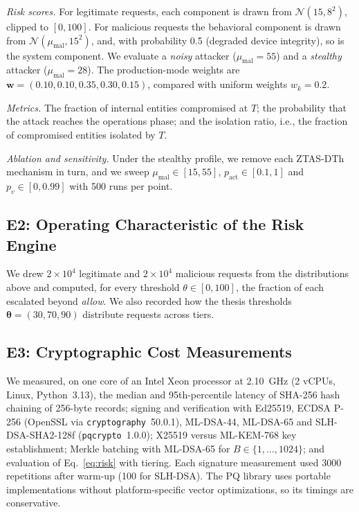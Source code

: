 \documentclass[journal]{IEEEtran}
\newcommand{\ztas}{ZTAS-DTh}
\begin{document}
\emph{Risk scores.} For legitimate requests, each component is drawn from $\mathcal{N}(15,8^2)$, clipped to $[0,100]$. For malicious requests the behavioral component is drawn from $\mathcal{N}(\mu_{\mathrm{mal}},15^2)$, and, with probability 0.5 (degraded device integrity), so is the system component. We evaluate a \emph{noisy} attacker ($\mu_{\mathrm{mal}}=55$) and a \emph{stealthy} attacker ($\mu_{\mathrm{mal}}=28$). The production-mode weights are $\mathbf{w}=(0.10,0.10,0.35,0.30,0.15)$, compared with uniform weights $w_k=0.2$.

\emph{Metrics.} The fraction of internal entities compromised at $T$; the probability that the attack reaches the operations phase; and the isolation ratio, i.e., the fraction of compromised entities isolated by $T$.

\emph{Ablation and sensitivity.} Under the stealthy profile, we remove each \ztas{} mechanism in turn, and we sweep $\mu_{\mathrm{mal}}\in[15,55]$, $p_{\mathrm{act}}\in[0.1,1]$ and $p_v\in[0,0.99]$ with 500 runs per point.

\subsection{E2: Operating Characteristic of the Risk Engine}
We drew $2\times10^4$ legitimate and $2\times10^4$ malicious requests from the distributions above and computed, for every threshold $\theta\in[0,100]$, the fraction of each escalated beyond \emph{allow}. We also recorded how the thesis thresholds $\boldsymbol{\theta}=(30,70,90)$ distribute requests across tiers.

\subsection{E3: Cryptographic Cost Measurements}
We measured, on one core of an Intel Xeon processor at 2.10~GHz (2 vCPUs, Linux, Python~3.13), the median and 95th-percentile latency of SHA-256 hash chaining of 256-byte records; signing and verification with Ed25519, ECDSA P-256 (OpenSSL via \texttt{cryptography}~50.0.1), ML-DSA-44, ML-DSA-65 and SLH-DSA-SHA2-128f (\texttt{pqcrypto}~1.0.0); X25519 versus ML-KEM-768 key establishment; Merkle batching with ML-DSA-65 for $B\in\{1,\dots,1024\}$; and evaluation of Eq.~\eqref{eq:risk} with tiering. Each signature measurement used 3000 repetitions after warm-up (100 for SLH-DSA). The PQ library uses portable implementations without platform-specific vector optimizations, so its timings are conservative.
\end{document}
